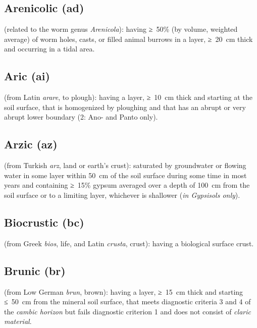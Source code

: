 \documentclass[
  letterpaper,
  DIV=11,
  numbers=noendperiod]{scrreprt}
\begin{document}
\hypertarget{arenicolic-ad}{%
\subsection{Arenicolic (ad)}\label{arenicolic-ad}}

(related to the worm genus \emph{Arenicola}): having ≥~50\% (by volume,
weighted average) of worm holes, casts, or filled animal burrows in a
layer, ≥~20~cm thick and occurring in a tidal area.

\hypertarget{aric-ai}{%
\subsection{Aric (ai)}\label{aric-ai}}

(from Latin \emph{arare}, to plough): having a layer, ≥~10~cm thick and
starting at the soil surface, that is homogenized by ploughing and that
has an abrupt or very abrupt lower boundary (2: Ano- and Panto only).

\hypertarget{arzic-az}{%
\subsection{Arzic (az)}\label{arzic-az}}

(from Turkish \emph{arz}, land or earth's crust): saturated by
groundwater or flowing water in some layer within 50~cm of the soil
surface during some time in most years and containing ≥~15\% gypsum
averaged over a depth of 100~cm from the soil surface or to a limiting
layer, whichever is shallower (\emph{in Gypsisols only}).

\hypertarget{biocrustic-bc}{%
\subsection{Biocrustic (bc)}\label{biocrustic-bc}}

(from Greek \emph{bios}, life, and Latin \emph{crusta}, crust): having a
biological surface crust.

\hypertarget{brunic-br}{%
\subsection{Brunic (br)}\label{brunic-br}}

(from Low German \emph{brun}, brown): having a layer, ≥~15~cm thick and
starting ≤~50~cm from the mineral soil surface, that meets diagnostic
criteria 3 and 4 of the \emph{cambic horizon} but fails diagnostic
criterion 1 and does not consist of \emph{claric material}.
\end{document}
